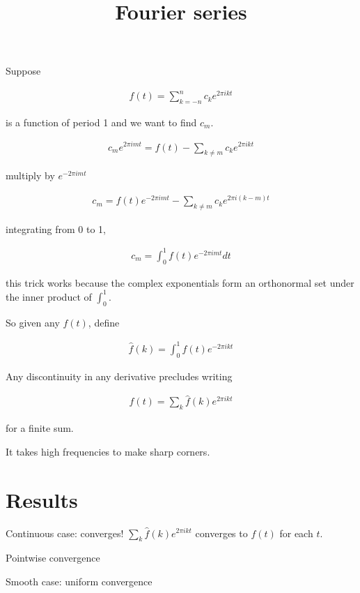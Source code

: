 \documentclass{article}
\title{Fourier series}
\date{}
\begin{document}
\maketitle

Suppose

\begin{align}
f(t) = \sum_{k=-n}^n c_k e^{2\pi i kt}
\end{align}

is a function of period 1 and we want to find $c_m$.

\begin{align}
c_m e^{2\pi i mt} = f(t) - \sum_{k\neq m} c_k e^{2\pi i kt}
\end{align}

multiply by $e^{-2\pi i mt}$

\begin{align}
c_m = f(t)e^{-2\pi i mt}  - \sum_{k\neq m} c_k e^{2\pi i (k-m)t}
\end{align}

integrating from 0 to 1,

\begin{align}
c_m = \int_0^1 f(t)e^{-2\pi i mt} dt
\end{align}

this trick works because the complex exponentials form an orthonormal set under the inner product of $\int_0^1$.

So given any $f(t)$, define

\begin{align}
\hat f(k) = \int_0^1 f(t)e^{-2\pi i kt}
\end{align}

Any discontinuity in any derivative precludes writing 

\begin{align}
f(t) = \sum_k \hat f(k) e^{2\pi i kt}
\end{align}

for a finite sum.

It takes high frequencies to make sharp corners.

\section{Results}

Continuous case: converges! $\sum_k \hat f(k) e^{2\pi i kt}$ converges to $f(t)$ for each $t$.

Pointwise convergence

Smooth case: uniform convergence
\end{document}
